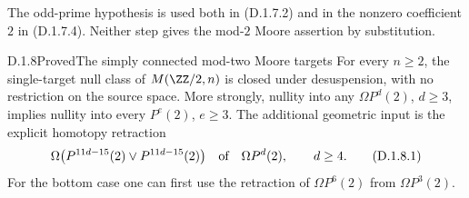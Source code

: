 The odd-prime hypothesis is used both in (D.1.7.2) and in the
nonzero coefficient $2$ in (D.1.7.4). Neither step gives the
mod-$2$ Moore assertion by substitution.

\begin{claim}{D.1.8}{Proved}{The simply connected mod-two Moore targets}
For every $n\geq2$, the single-target null class of
$M(\ZZ/2,n)$ is closed under desuspension, with no restriction on
the source space. More strongly, nullity into any
$\Omega P^d(2)$, $d\geq3$, implies nullity into every
$P^e(2)$, $e\geq3$. The additional geometric input is the explicit
homotopy retraction
\[
 \Omega\bigl(P^{11d-15}(2)\vee P^{11d-15}(2)\bigr)
       \quad\hbox{of}\quad \Omega P^d(2),\qquad d\geq4.
 \tag{D.1.8.1}
\]
For the bottom case one can first use the retraction of
$\Omega P^6(2)$ from $\Omega P^3(2)$.
\end{claim}

